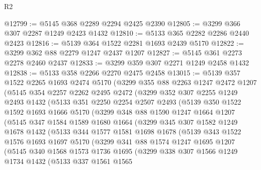 \begin{lexlean}{R2}
\begin{coremodule}
@12799 := @5145 @368 @2289 @2294 @2425 @2390
@12805 := @3299 @366 @307 @2287 @1249 @2423 @1432
@12810 := @5133 @365 @2282 @2286 @2440 @2423
@12816 := @5139 @364 @1522 @2281 @1693 @2439 @5170
@12822 := @3299 @362 @88 @2279 @1247 @2437 @1207
@12827 := @5145 @361 @2273 @2278 @2460 @2437
@12833 := @3299 @359 @307 @2271 @1249 @2458 @1432
@12838 := @5133 @358 @2266 @2270 @2475 @2458
@13015 := @5139
    @357
    @1522
    @2265
    @1693
    @2474
    @5170
    (@3299
      @355
      @88
      @2263
      @1247
      @2472
      @1207
      (@5145
        @354
        @2257
        @2262
        @2495
        @2472
        (@3299
          @352
          @307
          @2255
          @1249
          @2493
          @1432
          (@5133
            @351
            @2250
            @2254
            @2507
            @2493
            (@5139
              @350
              @1522
              @1592
              @1693
              @1666
              @5170
              (@3299
                @348
                @88
                @1590
                @1247
                @1664
                @1207
                (@5145
                  @347
                  @1584
                  @1589
                  @1680
                  @1664
                  (@3299
                    @345
                    @307
                    @1582
                    @1249
                    @1678
                    @1432
                    (@5133
                      @344
                      @1577
                      @1581
                      @1698
                      @1678
                      (@5139
                        @343
                        @1522
                        @1576
                        @1693
                        @1697
                        @5170
                        (@3299
                          @341
                          @88
                          @1574
                          @1247
                          @1695
                          @1207
                          (@5145
                            @340
                            @1568
                            @1573
                            @1736
                            @1695
                            (@3299
                              @338
                              @307
                              @1566
                              @1249
                              @1734
                              @1432
                              (@5133
                                @337
                                @1561
                                @1565

\end{coremodule}
\end{lexlean}
